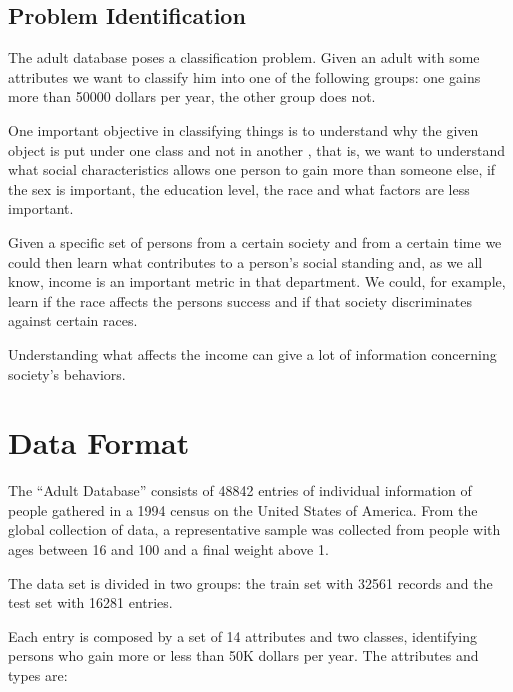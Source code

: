 \documentclass[a4paper]{llncs}
\begin{document}
\subsection{Problem Identification}

The adult database poses a classification problem. Given an adult
with some attributes we want to classify him into one of the following groups:
one gains more than 50000 dollars per year, the other group does not.

One important objective in classifying things is to understand why the given object
is put under one class and not in another \cite{2}\cite{3}, that is, we want to understand what social characteristics
allows one person to gain more than someone else, if the sex is important, the education level,
the race and what factors are less important.

Given a specific set of persons from a certain society and from a certain time we could then
learn what contributes to a person's social standing and, as we all know, income is an important
metric in that department. We could, for example, learn if the race affects the persons success and if
that society discriminates against certain races.

Understanding what affects the income can give a lot of information concerning society's behaviors.

\section{Data Format}

The ``Adult Database'' consists of 48842 entries of individual information of 
people gathered in a 1994 census on the United States of America. From the
global collection of data, a representative sample was collected from people
with ages between 16 and 100 and a final weight above 1.

The data set is divided in two groups: the train set with 32561 records and the test set with 16281 entries.

Each entry is composed by a set of 14 attributes and two classes, identifying
persons who gain more or less than 50K dollars per year. The attributes and types are:
\end{document}
